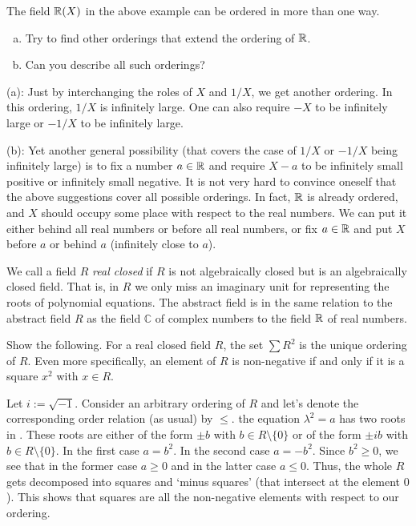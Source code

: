 \begin{exercise}
	\label{exer:all:orderings:rational:functions}
	The field $\mathbb{R}(X)$ in the above example can be ordered in more than one way. 
	\begin{enumerate}[(a)]
		\item Try to find other orderings that extend the ordering of $\mathbb{R}$. 
		\item Can you describe all such orderings? 
	\end{enumerate}
\end{exercise}
\begin{solution}
	(a): Just by interchanging the roles of $X$ and $1/X$, we get another ordering. In this ordering, $1/X$ is infinitely large. One can also require $-X$ to be infinitely large or $-1/X$ to be infinitely large. 
	
	(b): Yet another general possibility (that covers the case of $1/X$ or $-1/X$ being infinitely large) is to fix a number $a \in \mathbb{R}$ and require $X-a$ to be infinitely small positive or infinitely small negative. It is not very hard to convince oneself that the above suggestions cover all possible orderings. In fact, $\mathbb{R}$ is already ordered, and $X$ should occupy some place with respect to the real numbers. We can put it either behind all real numbers or before all real numbers, or fix $a \in \mathbb{R}$ and put $X$ before $a$ or behind $a$ (infinitely close to $a$). 
\end{solution}

We call a field $R$ \emph{real closed} if $R$ is not algebraically closed but  is an algebraically closed field. That is, in $R$ we only miss an imaginary unit for representing the roots of polynomial equations. The abstract field  is in the same relation to the abstract field $R$ as the field $\mathbb{C}$ of complex numbers to the field $\mathbb{R}$ of real numbers. 

\begin{exercise}
Show the following. For a real closed field $R$, the set  $\sum R^2$ is the unique ordering of $R$. Even more specifically, an element of $R$ is non-negative  if and only if it is a square $x^2$ with $x \in R$. 
\end{exercise}
\begin{solution}
	Let $i:= \sqrt{-1}$. Consider an arbitrary ordering of $R$ and let's denote the corresponding order relation (as usual) by $\le$.
    the equation $\lambda^2 = a$ has two roots in . These roots are either of the form $\pm b$ with $b \in R \setminus \{0\}$ or of the form $\pm i b$ with $b \in R \setminus \{0\}$. In the first case $a = b^2$. In the second case $a = - b^2$. Since $b^2 \ge 0$, we see that in the former case $a \ge 0$ and in the latter case $a \le 0$. Thus, the whole $R$ gets decomposed into squares and `minus squares' (that intersect at the element $0$). This shows that squares are all the non-negative elements with respect to our ordering. 
\end{solution}


